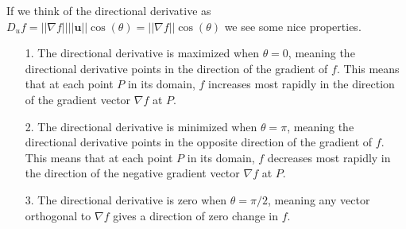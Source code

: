 \documentclass[12pt, letter]{article}
\theoremstyle{plain}
\numberwithin{theorem}{section}
\theoremstyle{definition}
\begin{document}
\bigskip

\hrulefill

\bigskip

If we think of the directional derivative as $D_u f = ||\nabla f|| ||\bm{u}|| \cos(\theta) = ||\nabla f|| \cos(\theta)$ we see some nice properties.
\begin{itemize}
\item[1.] The directional derivative is maximized when $\theta = 0$, meaning the directional derivative points in the direction of the gradient of $f$. This means that at each point $P$ in its domain, $f$ increases most rapidly in the direction of the gradient vector $\nabla f$ at $P$.
\item[2.] The directional derivative is minimized when $\theta = \pi$, meaning the directional derivative points in the opposite direction of the gradient of $f$. This means that at each point $P$ in its domain, $f$ decreases most rapidly in the direction of the  negative gradient vector $\nabla f$ at $P$.
\item[3.] The directional derivative is zero when $\theta = \pi/2$, meaning any vector orthogonal to $\nabla f$ gives a direction of zero change in $f$.
\end{itemize}

\bigskip

\hrulefill

\bigskip
\end{document}
